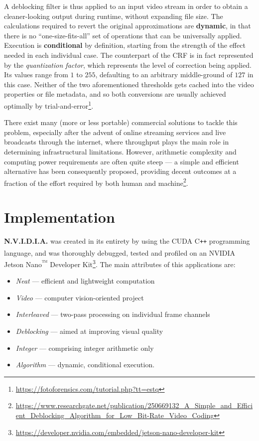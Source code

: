 \documentclass{article}
\begin{document}
A deblocking filter is thus applied to an input video stream in order to obtain a cleaner-looking output during runtime, without expanding file size. The calculations required to revert the original approximations are \textbf{dynamic}, in that there is no ``one-size-fits-all'' set of operations that can be universally applied. Execution is \textbf{conditional} by definition, starting from the strength of the effect needed in each individual case. The counterpart of the CRF is in fact represented by the \textit{quantization factor}, which represents the level of correction being applied. Its values range from $1$ to $255$, defaulting to an arbitrary middle-ground of $127$ in this case. Neither of the two aforementioned thresholds gets cached into the video properties or file metadata, and so both conversions are usually achieved optimally by trial-and-error\footnote{\url{https://fotoforensics.com/tutorial.php?tt=estq}}.

There exist many (more or less portable) commercial solutions to tackle this problem, especially after the advent of online streaming services and live broadcasts through the internet, where throughput plays the main role in determining infrastructural limitations. However, arithmetic complexity and computing power requirements are often quite steep --- a simple and efficient alternative has been consequently proposed, providing decent outcomes at a fraction of the effort required by both human and machine\footnote{\url{https://www.researchgate.net/publication/250669132_A_Simple_and_Efficient_Deblocking_Algorithm_for_Low_Bit-Rate_Video_Coding}}.

\section{Implementation}
\textsf{\textbf{N.V.I.D.I.A.}} was created in its entirety by using the CUDA C\texttt{++} programming language, and was thoroughly debugged, tested and profiled on an NVIDIA\textsuperscript{\fontsize{6}{0}\selectfont\textregistered} Jetson Nano\textsuperscript{\fontsize{6}{0}\selectfont ™} Developer Kit\footnote{\url{https://developer.nvidia.com/embedded/jetson-nano-developer-kit}}. The main attributes of this applications are:
\begin{itemize}
    \item \textsf{\textit{Neat}} --- efficient and lightweight computation
    \item \textsf{\textit{Video}} --- computer vision-oriented project
    \item \textsf{\textit{Interleaved}} --- two-pass processing on individual frame channels
    \item \textsf{\textit{Deblocking}} --- aimed at improving visual quality
    \item \textsf{\textit{Integer}} --- comprising integer arithmetic only
    \item \textsf{\textit{Algorithm}} --- dynamic, conditional execution.
\end{itemize}
\end{document}

